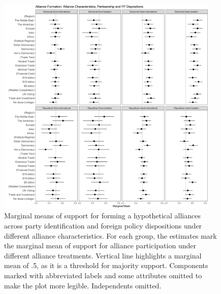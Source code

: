 \documentclass[12pt]{article}
\begin{document}
\begin{figure}
	\centering
		\includegraphics[width=0.95\textwidth]{../figures/party-dispo-form-char.png}
	\caption{Marginal means of support for forming a hypothetical alliances across party identification and foreign policy dispositions under different alliance characteristics. For each group, the estimates mark the marginal mean of support for alliance participation under different alliance treatments. Vertical line highlights a marginal mean of .5, as it is a threshold for majority support. Components marked with abbreviated labels and some attributes omitted to make the plot more legible. Independents omitted.}
	\label{fig:party-dispo-form-char}
\end{figure}
\end{document}
